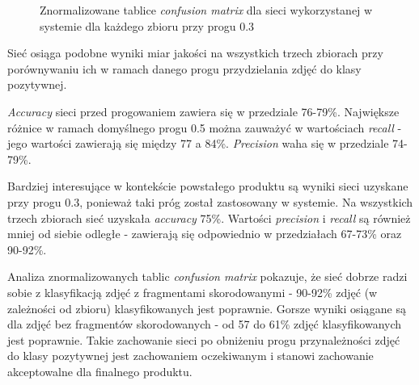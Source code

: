 \documentclass[polish,12pt]{aghthesis}
\begin{document}
\begin{figure}[H]
    \ContinuedFloat
    \begin{adjustbox}{minipage=1.0\paperwidth, pagecenter}
    \centering
    \end{adjustbox}
    \caption{Znormalizowane tablice \textit{confusion matrix} dla sieci wykorzystanej w systemie dla każdego zbioru przy progu 0.3}
\end{figure}

\par Sieć osiąga podobne wyniki miar jakości na wszystkich trzech zbiorach przy porównywaniu ich w ramach danego progu przydzielania zdjęć do klasy pozytywnej. \par \textit{Accuracy} sieci przed progowaniem zawiera się w przedziale 76-79\%. Największe różnice w ramach domyślnego progu 0.5 można zauważyć w wartościach \textit{recall} - jego wartości zawierają się między 77 a 84\%. \textit{Precision} waha się w przedziale 74-79\%.

\par Bardziej interesujące w kontekście powstałego produktu są wyniki sieci uzyskane przy progu 0.3, ponieważ taki próg został zastosowany w systemie. Na wszystkich trzech zbiorach sieć uzyskała \textit{accuracy} 75\%. Wartości \textit{precision} i \textit{recall} są również mniej od siebie odległe - zawierają się odpowiednio w przedziałach 67-73\% oraz 90-92\%.

\par Analiza znormalizowanych tablic \textit{confusion matrix} pokazuje, że sieć dobrze radzi sobie z klasyfikacją zdjęć z fragmentami skorodowanymi - 90-92\% zdjęć (w zależności od zbioru) klasyfikowanych jest poprawnie. Gorsze wyniki osiągane są dla zdjęć bez fragmentów skorodowanych - od 57 do 61\% zdjęć klasyfikowanych jest poprawnie. Takie zachowanie sieci po obniżeniu progu przynależności zdjęć do klasy pozytywnej jest zachowaniem oczekiwanym i stanowi zachowanie akceptowalne dla finalnego produktu.
\end{document}
